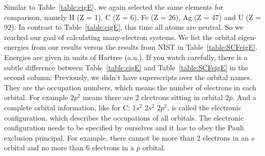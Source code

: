 Similar to Table~\ref{table:eigE}, we again selected the same elements for comparison,
namely H (Z = 1), C (Z = 6), Fe (Z = 26), Ag (Z = 47) and U (Z = 92). In contrast
to Table~\ref{table:eigE}, this time all atoms are neutral. So we reached our
goal of calculating many-electron systems. We list the orbital eigen-energies from our
results versus the results from NIST in Table~\ref{table:SCFeigE}.
Energies are given in units of Hartree (a.u.).
If you watch carefully, there is a subtle difference between Table~\ref{table:eigE}
and Table~\ref{table:SCFeigE} in the second column: Previously, we didn't have
superscripts over the orbital names. They are the occupation numbers, which
means the number of electrons in each orbital. For example $2p^2$ means there are
2 electrons sitting in orbital $2p$. And a complete orbital information, like for C: $1s^2$
$2s^2$ $2p^2$, is called the electronic configuration, which describes the occupations
of all orbitals. The electronic configuration needs to be specified by ourselves
and it has to obey the Pauli exclusion principal. For example, there cannot be
more than 2 electrons in an $s$ orbital and no more than 6 electrons in a $p$ orbital.

